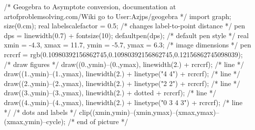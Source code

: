 /* Geogebra to Asymptote conversion, documentation at artofproblemsolving.com/Wiki go to User:Azjps/geogebra */
import graph; size(0.cm); 
real labelscalefactor = 0.5; /* changes label-to-point distance */
pen dps = linewidth(0.7) + fontsize(10); defaultpen(dps); /* default pen style */ real xmin = -4.3, xmax = 11.7, ymin = -5.7, ymax = 6.3;  /* image dimensions */
pen rcrcrf = rgb(0.10980392156862745,0.10980392156862745,0.12156862745098039); 
 /* draw figures */
draw((0.,ymin)--(0.,ymax), linewidth(2.) + rcrcrf); /* line */
draw((1.,ymin)--(1.,ymax), linewidth(2.) + linetype("4 4") + rcrcrf); /* line */
draw((2.,ymin)--(2.,ymax), linewidth(2.) + linetype("2 2") + rcrcrf); /* line */
draw((3.,ymin)--(3.,ymax), linewidth(2.) + dotted + rcrcrf); /* line */
draw((4.,ymin)--(4.,ymax), linewidth(2.) + linetype("0 3 4 3") + rcrcrf); /* line */
 /* dots and labels */
clip((xmin,ymin)--(xmin,ymax)--(xmax,ymax)--(xmax,ymin)--cycle); 
 /* end of picture */
